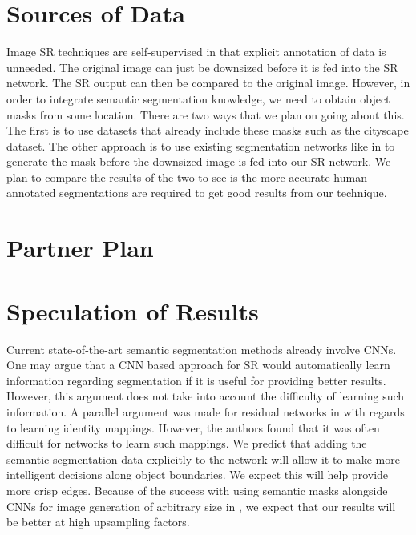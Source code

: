 \documentclass[10pt,twocolumn,letterpaper]{article}
\begin{document}
\section{Sources of Data}
Image SR techniques are self-supervised in that explicit annotation of data is unneeded. The original image can just be downsized before it is fed into the SR network. The SR output can then be compared to the original image. However, in order to integrate semantic segmentation knowledge, we need to obtain object masks from some location. There are two ways that we plan on going about this. The first is to use datasets that already include these masks such as the cityscape dataset. The other approach is to use existing segmentation networks like in \cite{FullyConvolutionalSS} to generate the mask before the downsized image is fed into our SR network. We plan to compare the results of the two to see is the more accurate human annotated segmentations are required to get good results from our technique.


\section{Partner Plan}


\section{Speculation of Results}
Current state-of-the-art semantic segmentation methods already involve CNNs.
One may argue that a CNN based approach for SR would automatically learn
information regarding segmentation if it is useful for providing better
results. However, this argument does not take into account the difficulty of
learning such information. A parallel argument was made for residual networks
in \cite{ResNet} with regards to learning identity mappings. However, the
authors found that it was often difficult for networks to learn such mappings.
We predict that adding the semantic segmentation data explicitly to the network
will allow it to make more intelligent decisions along object boundaries. We
expect this will help provide more crisp edges. Because of the success with
using semantic masks alongside CNNs for image generation of arbitrary size in
\cite{ImageSynthesis}, we expect that our results will be better at high
upsampling factors.

{\small


}
\end{document}
